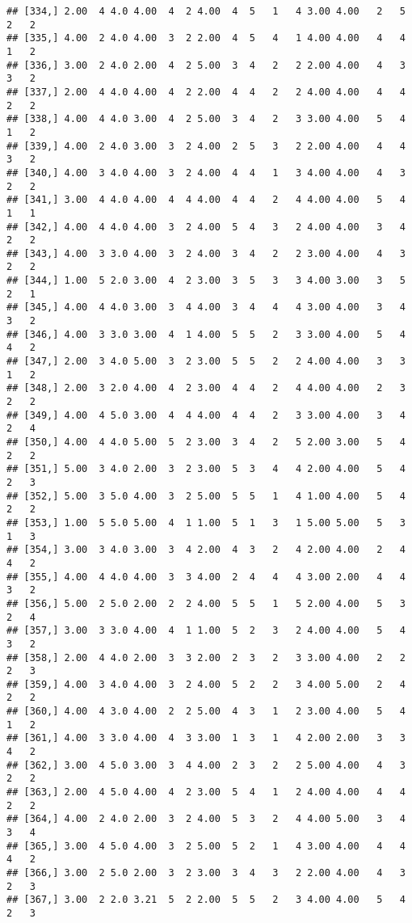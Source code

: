 \documentclass[]{article}
\begin{document}
\begin{verbatim}
## [334,] 2.00  4 4.0 4.00  4  2 4.00  4  5   1   4 3.00 4.00   2   5   2   2
## [335,] 4.00  2 4.0 4.00  3  2 2.00  4  5   4   1 4.00 4.00   4   4   1   2
## [336,] 3.00  2 4.0 2.00  4  2 5.00  3  4   2   2 2.00 4.00   4   3   3   2
## [337,] 2.00  4 4.0 4.00  4  2 2.00  4  4   2   2 4.00 4.00   4   4   2   2
## [338,] 4.00  4 4.0 3.00  4  2 5.00  3  4   2   3 3.00 4.00   5   4   1   2
## [339,] 4.00  2 4.0 3.00  3  2 4.00  2  5   3   2 2.00 4.00   4   4   3   2
## [340,] 4.00  3 4.0 4.00  3  2 4.00  4  4   1   3 4.00 4.00   4   3   2   2
## [341,] 3.00  4 4.0 4.00  4  4 4.00  4  4   2   4 4.00 4.00   5   4   1   1
## [342,] 4.00  4 4.0 4.00  3  2 4.00  5  4   3   2 4.00 4.00   3   4   2   2
## [343,] 4.00  3 3.0 4.00  3  2 4.00  3  4   2   2 3.00 4.00   4   3   2   2
## [344,] 1.00  5 2.0 3.00  4  2 3.00  3  5   3   3 4.00 3.00   3   5   2   1
## [345,] 4.00  4 4.0 3.00  3  4 4.00  3  4   4   4 3.00 4.00   3   4   3   2
## [346,] 4.00  3 3.0 3.00  4  1 4.00  5  5   2   3 3.00 4.00   5   4   4   2
## [347,] 2.00  3 4.0 5.00  3  2 3.00  5  5   2   2 4.00 4.00   3   3   1   2
## [348,] 2.00  3 2.0 4.00  4  2 3.00  4  4   2   4 4.00 4.00   2   3   2   2
## [349,] 4.00  4 5.0 3.00  4  4 4.00  4  4   2   3 3.00 4.00   3   4   2   4
## [350,] 4.00  4 4.0 5.00  5  2 3.00  3  4   2   5 2.00 3.00   5   4   2   2
## [351,] 5.00  3 4.0 2.00  3  2 3.00  5  3   4   4 2.00 4.00   5   4   2   3
## [352,] 5.00  3 5.0 4.00  3  2 5.00  5  5   1   4 1.00 4.00   5   4   2   2
## [353,] 1.00  5 5.0 5.00  4  1 1.00  5  1   3   1 5.00 5.00   5   3   1   3
## [354,] 3.00  3 4.0 3.00  3  4 2.00  4  3   2   4 2.00 4.00   2   4   4   2
## [355,] 4.00  4 4.0 4.00  3  3 4.00  2  4   4   4 3.00 2.00   4   4   3   2
## [356,] 5.00  2 5.0 2.00  2  2 4.00  5  5   1   5 2.00 4.00   5   3   2   4
## [357,] 3.00  3 3.0 4.00  4  1 1.00  5  2   3   2 4.00 4.00   5   4   3   2
## [358,] 2.00  4 4.0 2.00  3  3 2.00  2  3   2   3 3.00 4.00   2   2   2   3
## [359,] 4.00  3 4.0 4.00  3  2 4.00  5  2   2   3 4.00 5.00   2   4   2   2
## [360,] 4.00  4 3.0 4.00  2  2 5.00  4  3   1   2 3.00 4.00   5   4   1   2
## [361,] 4.00  3 3.0 4.00  4  3 3.00  1  3   1   4 2.00 2.00   3   3   4   2
## [362,] 3.00  4 5.0 3.00  3  4 4.00  2  3   2   2 5.00 4.00   4   3   2   2
## [363,] 2.00  4 5.0 4.00  4  2 3.00  5  4   1   2 4.00 4.00   4   4   2   2
## [364,] 4.00  2 4.0 2.00  3  2 4.00  5  3   2   4 4.00 5.00   3   4   3   4
## [365,] 3.00  4 5.0 4.00  3  2 5.00  5  2   1   4 3.00 4.00   4   4   4   2
## [366,] 3.00  2 5.0 2.00  3  2 3.00  3  4   3   2 2.00 4.00   4   3   2   3
## [367,] 3.00  2 2.0 3.21  5  2 2.00  5  5   2   3 4.00 4.00   5   4   2   3

\end{verbatim}
\end{document}
